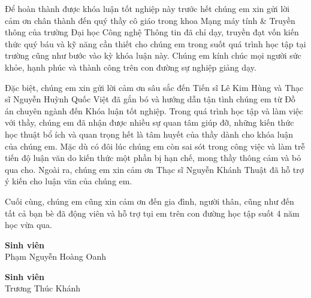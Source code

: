 
Để hoàn thành được khóa luận tốt nghiệp này trước hết chúng em xin gửi lời cảm ơn chân thành đến quý thầy cô giáo trong khoa Mạng máy tính \& Truyền thông của trường Đại học Công nghệ Thông tin đã chỉ dạy, truyền đạt vốn kiến thức quý báu và kỹ năng cần thiết cho chúng em trong suốt quá trình học tập tại trường cũng như bước vào kỳ khóa luận này. Chúng em kính chúc mọi người sức khỏe, hạnh phúc và thành công trên con đường sự nghiệp giảng dạy. 

Đặc biệt, chúng em xin gửi lời cảm ơn sâu sắc đến Tiến sĩ Lê Kim Hùng và Thạc sĩ Nguyễn Huỳnh Quốc Việt đã gắn bó và hướng dẫn tận tình chúng em từ Đồ án chuyên ngành đến Khóa luận tốt nghiệp. Trong quá trình học tập và làm việc với thầy, chúng em đã nhận được nhiều sự quan tâm giúp đỡ, những kiến thức học thuật bổ ích và quan trọng hết là tâm huyết của thầy dành cho khóa luận của chúng em. Mặc dù có đôi lúc chúng em còn sai sót trong công việc và làm trễ tiến độ luận văn do kiến thức một phần bị hạn chế, mong thầy thông cảm và bỏ qua cho. Ngoài ra, chúng em xin cảm ơn Thạc sĩ Nguyễn Khánh Thuật đã hỗ trợ ý kiến cho luận văn của chúng em.

Cuối cùng, chúng em cũng xin cảm ơn đến gia đình, người thân, cũng như đến tất cả bạn bè đã động viên và hỗ trợ tụi em trên con đường học tập suốt 4 năm học vừa qua. 

\begin{minipage}{2in}
    \textbf{Sinh viên} \\
    Phạm Nguyễn Hoàng Oanh
    \end{minipage}
    \hfill
    \begin{minipage}{2in}
    \textbf{Sinh viên} \\
    Trương Thúc Khánh
\end{minipage}
